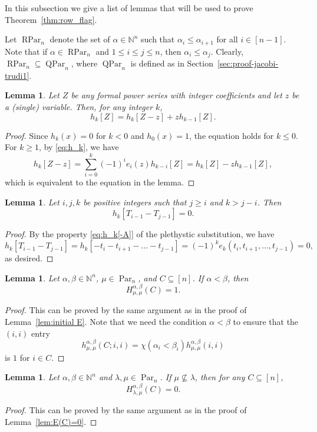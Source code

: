 \documentclass[12pt]{amsart}
\numberwithin{equation}{section}
\newtheorem{lem}[thm]{Lemma}
\theoremstyle{definition}
\newcommand\NN{\mathbb{N}}
\newcommand\Par{\operatorname{Par}}
\newcommand\RPar{\operatorname{RPar}}
\newcommand\QPar{\operatorname{QPar}}
\begin{document}
In this subsection we give a list of lemmas that will be used to prove
Theorem~\ref{thm:row_flag}.

Let $\RPar_n$ denote the set of $\alpha\in\NN^n$ such that $\alpha_i\le
\alpha_{i+1}$ for all $i\in[n-1]$.
Note that if $\alpha\in\RPar_n$ and $1\le i\le j\le n$,
then $\alpha_i\le \alpha_j$.
Clearly, $\RPar_n \subseteq \QPar_n$, where $\QPar_n$ is defined as in
Section~\ref{sec:proof-jacobi-trudi1}.

\begin{lem}\label{lem:pleth_h}
  Let $Z$ be any formal power series with integer coefficients and let $z$ be a
  (single) variable. Then, for any integer $k$,
  \[
h_k[Z]=h_k[Z-z] + z h_{k-1}[Z].
  \]  
\end{lem}
\begin{proof}
  Since $h_k(x)=0$ for $k<0$ and $h_0(x)=1$, the equation holds for $k\le 0$.
  For $k\ge1$, by \eqref{eq:h_k}, we have
  \[
    h_k[Z-z]=\sum_{i=0}^k (-1)^i e_i(z)h_{k-i}[Z]=
    h_{k}[Z]- zh_{k-1}[Z],
  \]  
which is equivalent to the equation in the lemma.
\end{proof}


\begin{lem}\label{lem:h=0}
  Let $i,j,k$ be positive integers such that
  $j\ge i$ and $k>j-i$. Then
  \[
    h_k[T_{i-1}-T_{j-1}]=0.
  \] 
\end{lem}
\begin{proof}
  By the property \eqref{eq:h_k[-A]} of the plethystic substitution, we have
  \[
    h_k[T_{i-1}-T_{j-1}]=h_k[-t_i-t_{i+1}-\dots-t_{j-1}]
    = (-1)^k e_k(t_i,t_{i+1},\dots,t_{j-1}) = 0,
  \]  
  as desired.
\end{proof}



\begin{lem}\label{lem:initial H}
  Let $\alpha,\beta\in\NN^n$, $\mu\in\Par_n$, and $C\subseteq[n]$. If
  $\alpha<\beta$, then
\[
  H^{\alpha,\beta}_{\mu,\mu}(C) = 1.
\] 
\end{lem}
\begin{proof}
  This can be proved by the same argument as in the proof of
  Lemma~\ref{lem:initial E}. Note that we need the condition $\alpha<\beta$ to
  ensure that the $(i,i)$ entry 
\[
h^{\alpha,\beta}_{\mu,\mu}(C;i,i) =
  \chi(\alpha_i<\beta_i) h^{\alpha,\beta}_{\mu,\mu}(i,i)
\]
is $1$ for $i\in C$.
\end{proof}


\begin{lem}\label{lem:H=0}
  Let $\alpha,\beta\in\NN^n$ and $\lambda,\mu\in\Par_n$. If
  $\mu\not\subseteq\lambda$, then for any $C\subseteq[n]$,
\[
  H^{\alpha,\beta}_{\lambda,\mu}(C) = 0.
\] 
\end{lem}
\begin{proof}
This can be proved by the same argument as in the proof of
Lemma~\ref{lem:E(C)=0}. 
\end{proof}
\end{document}
